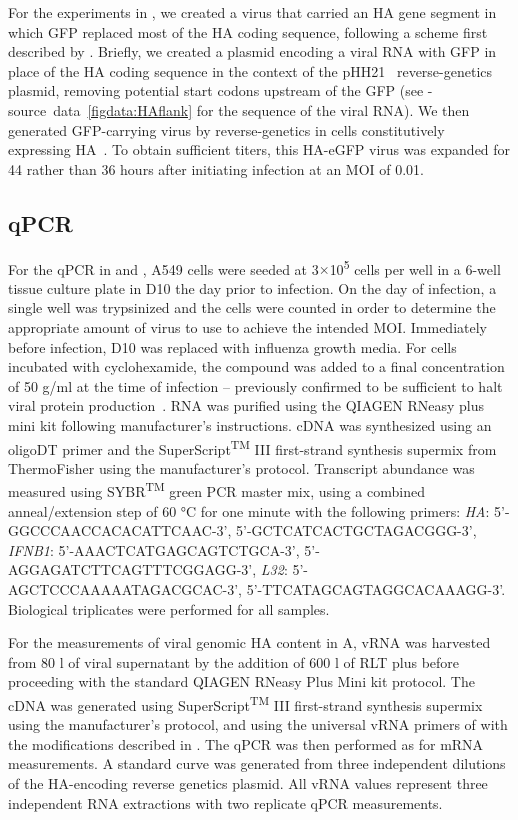\documentclass[9pt,lineno]{elife}
\begin{document}
For the experiments in , we created a virus that carried an HA gene segment in which GFP replaced most of the HA coding sequence, following a scheme first described by \citet{marsh2007specific}.
Briefly, we created a plasmid encoding a viral RNA with GFP in place of the HA coding sequence in the context of the pHH21~\citep{Neumann:1999ws} reverse-genetics plasmid, removing potential start codons upstream of the GFP (see -source~data~\ref{figdata:HAflank} for the sequence of the viral RNA).
We then generated GFP-carrying virus by reverse-genetics in cells constitutively expressing HA~\citep{Doud:2016gm}.
To obtain sufficient titers, this HA-eGFP virus was expanded for 44 rather than 36 hours after initiating infection at an MOI of 0.01.

\subsection{qPCR}
For the qPCR in  and , A549 cells were seeded at 3$\times$10\textsuperscript{5} cells per well in a 6-well tissue culture plate in D10 the day prior to infection. 
On the day of infection, a single well was trypsinized and the cells were counted in order to determine the appropriate amount of virus to use to achieve the intended MOI.
Immediately before infection, D10 was replaced with influenza growth media.
For cells incubated with cyclohexamide, the compound was added to a final concentration of 50  \si{\micro}g/ml at the time of infection -- previously confirmed to be sufficient to halt viral protein production~\citep{Killip:2014kz}.
RNA was purified using the QIAGEN RNeasy plus mini kit following manufacturer's instructions. 
cDNA was synthesized using an oligoDT primer and the SuperScript\textsuperscript{TM} III first-strand synthesis supermix from ThermoFisher using the manufacturer's protocol. 
Transcript abundance was measured using SYBR\textsuperscript{TM} green PCR master mix, using a combined anneal/extension step of 60 \si{\degreeCelsius } for one minute with the following primers: \emph{HA}: 5'-GGCCCAACCACACATTCAAC-3', 5'-GCTCATCACTGCTAGACGGG-3', \emph{IFNB1}: 5'-AAACTCATGAGCAGTCTGCA-3', 5'-AGGAGATCTTCAGTTTCGGAGG-3', \emph{L32}: 5'-AGCTCCCAAAAATAGACGCAC-3', 5'-TTCATAGCAGTAGGCACAAAGG-3'.   
Biological triplicates were performed for all samples.

For the measurements of viral genomic HA content in A, vRNA was harvested from 80 \si{\micro}l of viral supernatant by the addition of 600 \si{\micro}l of RLT plus before proceeding with the standard QIAGEN RNeasy Plus Mini kit protocol.
The cDNA was generated using SuperScript\textsuperscript{TM} III first-strand synthesis supermix using the manufacturer's protocol, and using the universal vRNA primers of \citet{Hoffmann:2001vj} with the modifications described in  \citet{Xue:2017dl}.
The qPCR was then performed as for mRNA measurements.
A standard curve was generated from three independent dilutions of the HA-encoding reverse genetics plasmid. 
All vRNA values represent three independent RNA extractions with two replicate qPCR measurements. 
\end{document}
